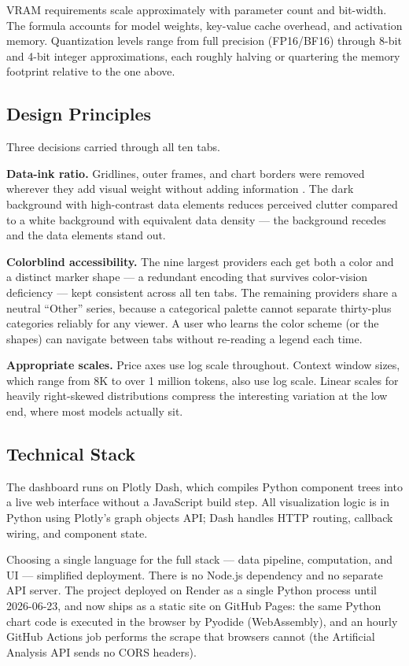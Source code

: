 \documentclass{article}
\begin{document}
VRAM requirements scale approximately with parameter count and bit-width.
The formula accounts for model weights, key-value cache overhead, and
activation memory. Quantization levels range from full precision (FP16/BF16)
through 8-bit and 4-bit integer approximations, each roughly halving or
quartering the memory footprint relative to the one above.

\subsection{Design Principles}

Three decisions carried through all ten tabs.

\textbf{Data-ink ratio.}
Gridlines, outer frames, and chart borders were removed wherever they add
visual weight without adding information \cite{tufte}. The dark background
with high-contrast data elements reduces perceived clutter compared to a
white background with equivalent data density --- the background recedes and
the data elements stand out.

\textbf{Colorblind accessibility.}
The nine largest providers each get both a color and a distinct marker shape ---
a redundant encoding that survives color-vision deficiency --- kept consistent
across all ten tabs. The remaining providers share a neutral ``Other''
series, because a categorical palette cannot separate thirty-plus categories
reliably for any viewer. A user who learns the color scheme (or the
shapes) can navigate between tabs without re-reading a legend each time.

\textbf{Appropriate scales.}
Price axes use log scale throughout. Context window sizes, which range from
8K to over 1 million tokens, also use log scale. Linear scales for heavily
right-skewed distributions compress the interesting variation at the low end,
where most models actually sit.

\subsection{Technical Stack}

The dashboard runs on Plotly Dash, which compiles Python component trees into
a live web interface without a JavaScript build step. All visualization logic
is in Python using Plotly's graph objects API; Dash handles HTTP routing,
callback wiring, and component state.

Choosing a single language for the full stack --- data pipeline, computation,
and UI --- simplified deployment. There is no Node.js dependency and no separate
API server. The project deployed on Render \cite{render} as a single Python
process until 2026-06-23, and now ships as a static site on GitHub Pages: the
same Python chart code is executed in the browser by Pyodide (WebAssembly),
and an hourly GitHub Actions job performs the scrape that browsers cannot
(the Artificial Analysis API sends no CORS headers).
\end{document}
